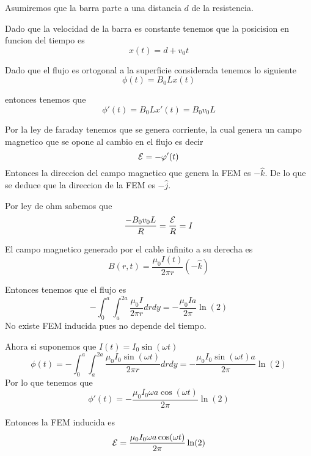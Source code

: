\documentclass[../main.tex]{subfiles}
\begin{document}
\begin{solution}
Asumiremos que la barra parte a una distancia $d$ de la resistencia.

Dado que la velocidad de la barra es constante tenemos que la posicision en funcion del tiempo
es
\begin{equation*}
  x(t) = d + v_{0}t
\end{equation*}

Dado que el flujo es ortogonal a la superficie considerada tenemos lo siguiente
\begin{equation*}
\phi(t) = B_{0}Lx(t)
\end{equation*}

entonces tenemos que
\begin{equation*}
  \phi'(t) = B_{0}Lx'(t) = B_{0}v_{0}L
\end{equation*}

Por la ley de faraday tenemos que se genera corriente, la cual genera un campo magnetico que se opone al cambio en el flujo es decir
\begin{equation*}
  \mathcal{E} = -\varphi'(t)
\end{equation*}
Entonces la direccion del campo magnetico que genera la FEM es $-\hat{k}$.
De lo que se deduce que la direccion de la FEM es $-\hat{j}$.

Por ley de ohm sabemos que
\begin{equation*}
\frac{-B_{0}v_{0}L}{R} = \frac{\mathcal{E}}{R} = I
\end{equation*}
\end{solution}
\begin{solution}
  El campo magnetico generado por el cable infinito a su derecha es
  \begin{equation*}
    B(r, t) = \frac{\mu_{0}I(t)}{2\pi r} (-\hat{k})
  \end{equation*}

  Entonces tenemos que el flujo es
  \begin{equation*}
    -\int_{0}^{a}\int_{a}^{2a} \frac{\mu_{0}I}{2\pi r} dr dy = -\frac{\mu_{0} I a}{2\pi} \ln(2)
  \end{equation*}
  No existe FEM inducida pues no depende del tiempo.

  Ahora si suponemos que $I(t) = I_{0}\sin(\omega t)$
  \begin{equation*}
    \phi(t) = -\int_{0}^{a}\int_{a}^{2a} \frac{\mu_{0}I_{0} \sin(\omega t)}{2\pi r} dr dy = -\frac{\mu_{0} I_{0} \sin(\omega t) a}{2\pi} \ln(2)
  \end{equation*}
  Por lo que tenemos que
  \begin{equation*}
    \phi'(t) = -\frac{\mu_{0} I_{0} \omega a \cos(\omega t)}{2\pi} \ln(2)
  \end{equation*}

  Entonces la FEM inducida es
  \begin{equation*}
    \mathcal{E} = \frac{\mu_{0} I_{0} \omega a \cos(\omega t)}{2\pi} \ln(2)
  \end{equation*}
\end{solution}
\end{document}
